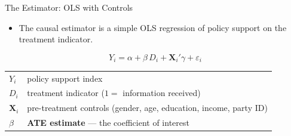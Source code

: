 \documentclass[aspectratio=169, 11pt]{beamer}
\begin{document}
\begin{frame}[t]{The Estimator: OLS with Controls}
\begin{itemize}
  \setlength\itemsep{0.5em}
  \item The causal estimator is a simple OLS regression of policy support on the treatment indicator.
\end{itemize}
\vspace{0.3em}
\begin{keybox}
\[
  Y_i = \alpha + \beta \, D_i + \mathbf{X}_i' \gamma + \varepsilon_i
\]
\vspace{-0.5em}
\begin{tabular}{ll}
  $Y_i$ & policy support index \\
  $D_i$ & treatment indicator ($1 =$ information received) \\
  $\mathbf{X}_i$ & pre-treatment controls (gender, age, education, income, party ID) \\
  $\beta$ & \textbf{ATE estimate} --- the coefficient of interest \\
\end{tabular}
\end{keybox}
\vspace{0.3em}
\end{frame}

\end{document}
